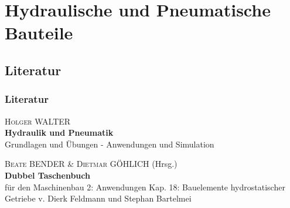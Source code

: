 


\section{Hydraulische und Pneumatische Bauteile}
\subsection{Literatur}
\begin{frame}
  \frametitle{Literatur}
  \textsc{Holger WALTER}\\
  {\Large\textbf{Hydraulik und Pneumatik}}\\
  Grundlagen und Übungen -
  Anwendungen und Simulation

  \vspace{3\baselineskip}
  \textsc{Beate BENDER \& Dietmar G\"OHLICH} (Hrsg.)\\
  {\Large\textbf{Dubbel Taschenbuch}}\\
  f\"ur den Maschinenbau 2:  Anwendungen
  {\small{}Kap. 18:
  Bauelemente hydrostatischer Getriebe v. 
  Dierk Feldmann und Stephan Bartelmei}


\end{frame}


